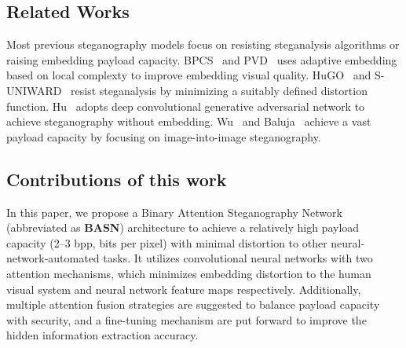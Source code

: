 \subsection{Related Works}

Most previous steganography models focus on resisting steganalysis algorithms or raising embedding payload capacity. BPCS~\cite{BPCS2002,BPCS2015} and PVD~\cite{PVD,PVD_LSB,PVD_Mod} uses adaptive embedding based on local complexty to improve embedding visual quality. HuGO~\cite{HUGO} and S-UNIWARD~\cite{S_UNIWARD} resist steganalysis by minimizing a suitably defined distortion function. Hu~\cite{GANStego} adopts deep convolutional generative adversarial network to achieve steganography without embedding. Wu~\cite{StegNet} and Baluja~\cite{HIPS} achieve a vast payload capacity by focusing on image-into-image steganography.

\subsection{Contributions of this work}

In this paper, we propose a Binary Attention Steganography Network (abbreviated as \textbf{BASN}) architecture to achieve a relatively high payload capacity (2--3 bpp, bits per pixel) with minimal distortion to other neural-network-automated tasks. It utilizes convolutional neural networks with two attention mechanisms, which minimizes embedding distortion to the human visual system and neural network feature maps respectively. Additionally, multiple attention fusion strategies are suggested to balance payload capacity with security, and a fine-tuning mechanism are put forward to improve the hidden information extraction accuracy.
